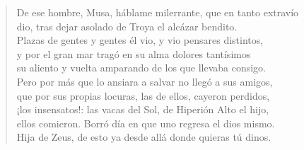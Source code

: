 \begin{verse}
De ese hombre, Musa, háblame milerrante, que en tanto extravío\\
dio, tras dejar asolado de Troya el alcázar bendito.\\
Plazas de gentes y gentes él vio, y vio pensares distintos,\\
y por el gran mar tragó en su alma dolores tantísimos\\
su aliento y vuelta amparando de los que llevaba consigo.\\
Pero por más que lo ansiara a salvar no llegó a sus amigos,\\
que por sus propias locuras, las de ellos, cayeron perdidos,\\
¡los insensatos!: las vacas del Sol, de Hiperión Alto el hijo,\\
ellos comieron. Borró día en que uno regresa el dios mismo.\\
Hija de Zeus, de esto ya desde allá donde quieras tú dinos.                     
\end{verse}



%
%
%

